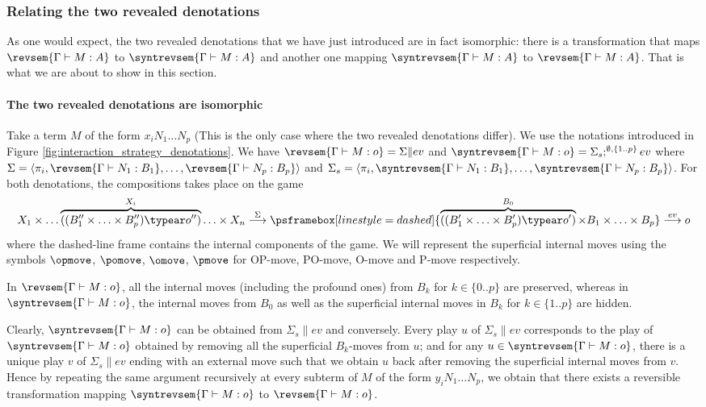 \subsubsection{Relating the two revealed denotations}
    \label{subsub:defdelta}

    As one would expect, the two revealed denotations that we have just introduced are in fact isomorphic: there is a transformation that maps $\revsem{\Gamma \vdash M : A}$ to $\syntrevsem{\Gamma \vdash M : A}$ and another one mapping $\syntrevsem{\Gamma \vdash M : A}$ to $\revsem{\Gamma \vdash M : A}$. That is what we are about to show in this section.

    \paragraph{The two revealed denotations are isomorphic}

    Take a term $M$ of the form $x_i N_1 \ldots N_p$ (This is the only case where the two revealed denotations differ). We use the notations introduced in Figure \ref{fig:interaction_strategy_denotations}.
    We have $\revsem{\Gamma \vdash M : o} =  \Sigma \|  ev$ and $\syntrevsem{\Gamma \vdash M : o} =  \Sigma_s ;^{\emptyset,\{1..p\}} ev$ where $\Sigma = \langle \pi_i, \revsem{\Gamma \vdash N_1 : B_1}, \ldots, \revsem{\Gamma \vdash N_p : B_p} \rangle$ and $\Sigma_s = \langle \pi_i, \syntrevsem{\Gamma \vdash N_1 : B_1}, \ldots, \syntrevsem{\Gamma \vdash N_p : B_p} \rangle$. For both denotations, the compositions takes place on the game
    $$ X_1 \times \ldots \overbrace{((B_1'' \times \ldots \times B_p'') \typear o'')}^{X_i} \ldots \times X_n \stackrel\Sigma\longrightarrow \psframebox[linestyle=dashed]{ \overbrace{((B_1' \times \ldots \times B_p') \typear o')}^{B_0} \times B_1 \times \ldots \times B_p }\stackrel{ev}\longrightarrow o$$
    where the dashed-line frame contains the internal components of the game. We will represent the superficial internal moves using the symbols $\opmove$, $\pomove$, $\omove$, $\pmove$ for OP-move, PO-move, O-move and P-move respectively.

    In $\revsem{\Gamma \vdash M : o}$, all the internal moves (including the profound ones) from $B_k$ for $k\in \{0..p\}$ are preserved, whereas in $\syntrevsem{\Gamma \vdash M : o}$, the internal moves from $B_0$ as well as the superficial internal moves in $B_k$ for $k\in \{1..p\}$ are hidden.


    Clearly, $\syntrevsem{\Gamma \vdash M : o}$ can be obtained from $\Sigma_s \| ev$ and conversely. Every play $u$ of $\Sigma_s \| ev$ corresponds to the play of $\syntrevsem{\Gamma \vdash M : o}$ obtained by removing all the superficial $B_k$-moves from $u$; and for any $u \in \syntrevsem{\Gamma \vdash M : o}$, there is a unique play $v$ of $\Sigma_s \| ev$ ending with an external move such that we obtain $u$ back after removing the superficial internal moves from $v$.
    Hence by repeating the same argument recursively at every subterm of $M$ of the form $y_i N_1 \ldots N_p$, we obtain that
    there exists a reversible transformation mapping $\syntrevsem{\Gamma \vdash M : o}$ to $\revsem{\Gamma \vdash M : o}$.

